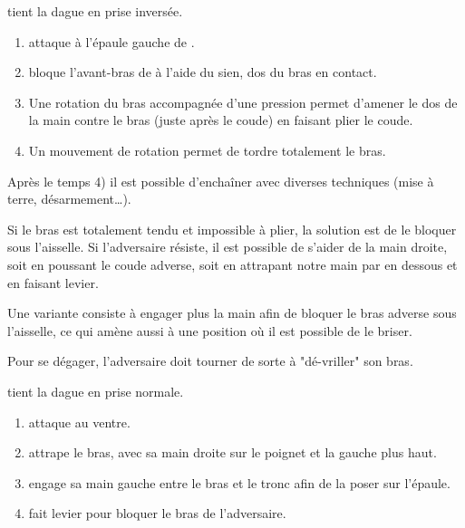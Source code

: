 \begin{technique}

\A tient la dague en prise inversée.

\begin{enumerate}
	\item \A attaque à l'épaule gauche de \D.
	
	\item \D bloque l'avant-bras de \A à l'aide du sien, dos du bras en contact.
	
	\item Une rotation du bras accompagnée d'une pression permet d'amener le dos de la main contre le bras (juste après le coude) en faisant plier le coude.
	
	\item Un mouvement de rotation permet de tordre totalement le bras.
\end{enumerate}

Après le temps 4) il est possible d'enchaîner avec diverses techniques (mise à terre, désarmement…).

Si le bras est totalement tendu et impossible à plier, la solution est de le bloquer sous l'aisselle.
Si l'adversaire résiste, il est possible de s'aider de la main droite, soit en poussant le coude adverse, soit en attrapant notre main par en dessous et en faisant levier.

Une variante consiste à engager plus la main afin de bloquer le bras adverse sous l'aisselle, ce qui amène aussi à une position où il est possible de le briser.

Pour se dégager, l'adversaire doit tourner de sorte à "dé-vriller" son bras.
\end{technique}


\begin{technique}

\A tient la dague en prise normale.

\begin{enumerate}
	\item \A attaque au ventre.
	
	\item \D attrape le bras, avec sa main droite sur le poignet et la gauche plus haut.
	
	\item \D engage sa main gauche entre le bras et le tronc afin de la poser sur l'épaule.
	
	\item \D fait levier pour bloquer le bras de l'adversaire.
\end{enumerate}
\end{technique}
